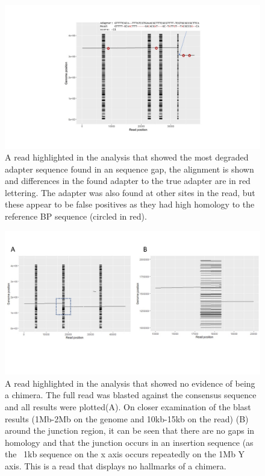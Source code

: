 \begin{figure}[h!]
\centering
\includegraphics[width=\textwidth{}]{Chapter_2/Adapter read1 with FP.jpg}
\caption{ A read highlighted in the analysis that showed the most degraded adapter sequence found in an sequence gap, the alignment is shown and differences in the found adapter to the true adapter are in red lettering. The adapter was also found at other sites in the read, but these appear to be false positives as they had high homology to the reference BP sequence (circled in red).}
\label{fig:Heatmap}
\end{figure}


\begin{figure}[h!]
\centering
\includegraphics[width=\textwidth{}]{Chapter_2/Read 9(2).jpg}
\caption{ A read highlighted in the analysis that showed no evidence of being a chimera. The full read was blasted against the consensus sequence and all results were plotted(A). On closer examination of the blast results (1Mb-2Mb on the genome and 10kb-15kb on the read) (B) around the junction region, it can be seen that there are no gaps in homology and that the junction occurs in an insertion sequence (as the ~1kb sequence on the x axis occurs repeatedly on the 1Mb Y axis. This is a read that displays no hallmarks of a chimera.}
\label{fig:Heatmap}
\end{figure}

